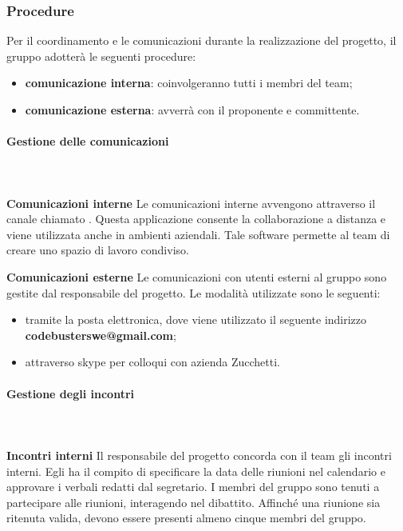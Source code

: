 \subsubsection{Procedure}
Per il coordinamento e le comunicazioni durante la realizzazione del progetto, il gruppo adotterà le seguenti procedure: 
\begin{itemize}
\item\textbf{comunicazione interna}: coinvolgeranno tutti i membri del team;
\item\textbf{comunicazione esterna}: avverrà con il proponente e committente.
\end{itemize}

\paragraph{Gestione delle comunicazioni}\mbox{}\\ \mbox{}\\
\textbf{Comunicazioni interne} \newline \newline
Le comunicazioni interne avvengono attraverso il canale chiamato . Questa applicazione consente la collaborazione a distanza e viene utilizzata anche in ambienti aziendali. Tale software permette al team di creare uno spazio di lavoro condiviso. \newline \newline

\textbf{Comunicazioni esterne} \newline \newline
Le comunicazioni con utenti esterni al gruppo sono gestite dal responsabile del progetto. Le modalità utilizzate sono le seguenti: 
\begin{itemize}
\item tramite la posta elettronica, dove viene utilizzato il seguente indirizzo \textbf{codebusterswe@gmail.com}; 
\item attraverso skype per colloqui con azienda Zucchetti.
\end{itemize} 

\paragraph{Gestione degli incontri}\mbox{}\\ \mbox{}\\
\textbf{Incontri interni} \newline \newline
Il responsabile del progetto concorda con il team gli incontri interni. Egli ha il compito di specificare la data delle riunioni nel calendario e approvare i verbali redatti dal segretario. I membri del gruppo sono tenuti a partecipare alle riunioni, interagendo nel dibattito. Affinché una riunione sia ritenuta valida, devono essere presenti almeno cinque membri del gruppo.\newline \newline

